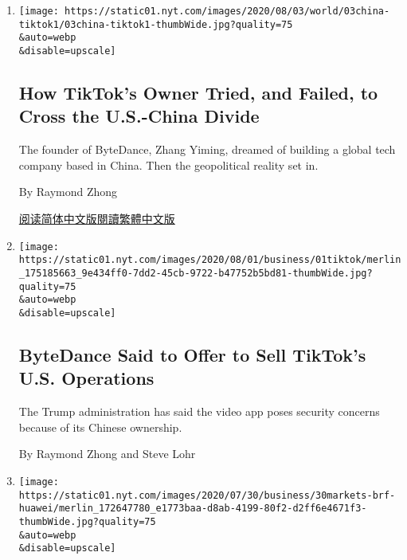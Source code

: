 \begin{enumerate}
\def\labelenumi{\arabic{enumi}.}
\item
  \href{/2020/08/03/technology/tiktok-bytedance-us-china.html}{}

  \texttt{[image: https://static01.nyt.com/images/2020/08/03/world/03china-tiktok1/03china-tiktok1-thumbWide.jpg?quality=75\\\&auto=webp\\\&disable=upscale]}

  \hypertarget{how-tiktoks-owner-tried-and-failed-to-cross-the-us-china-divide}{%
  \subsection{How TikTok's Owner Tried, and Failed, to Cross the
  U.S.-China
  Divide}\label{how-tiktoks-owner-tried-and-failed-to-cross-the-us-china-divide}}

  The founder of ByteDance, Zhang Yiming, dreamed of building a global
  tech company based in China. Then the geopolitical reality set in.

  By Raymond Zhong

  \href{https://cn.nytimes.com/technology/20200804/tiktok-trump-sale-microsoft/}{阅读简体中文版}\href{https://cn.nytimes.com/technology/20200804/tiktok-trump-sale-microsoft/zh-hant/}{閱讀繁體中文版}
\item
  \href{/2020/08/01/technology/tiktok-sale-trump-ban.html}{}

  \texttt{[image: https://static01.nyt.com/images/2020/08/01/business/01tiktok/merlin\_175185663\_9e434ff0-7dd2-45cb-9722-b47752b5bd81-thumbWide.jpg?quality=75\\\&auto=webp\\\&disable=upscale]}

  \hypertarget{bytedance-said-to-offer-to-sell-tiktoks-us-operations}{%
  \subsection{ByteDance Said to Offer to Sell TikTok's U.S.
  Operations}\label{bytedance-said-to-offer-to-sell-tiktoks-us-operations}}

  The Trump administration has said the video app poses security
  concerns because of its Chinese ownership.

  By Raymond Zhong and Steve Lohr
\item
  \href{/2020/07/30/business/huaweis-phones-outsell-samsungs-a-milestone-report-says.html}{}

  \texttt{[image: https://static01.nyt.com/images/2020/07/30/business/30markets-brf-huawei/merlin\_172647780\_e1773baa-d8ab-4199-80f2-d2ff6e4671f3-thumbWide.jpg?quality=75\\\&auto=webp\\\&disable=upscale]}


\end{enumerate}
